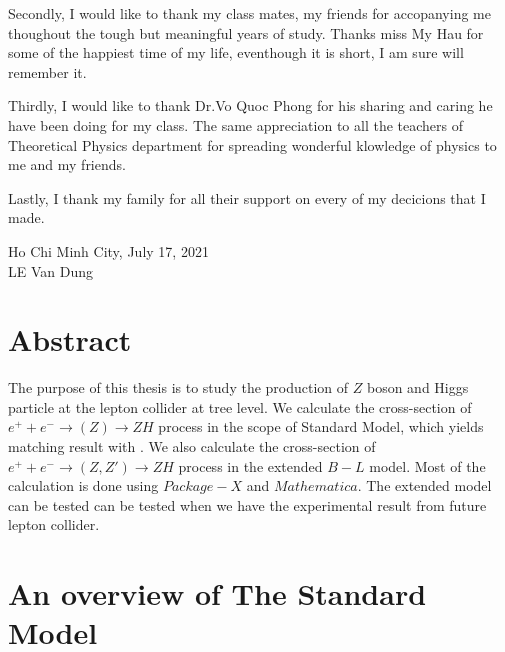 \documentclass{report}
\numberwithin{equation}{section}
\begin{document}
Secondly, I would like to thank my class mates, my friends for accopanying me thoughout the tough but meaningful years of study. Thanks miss My Hau for some of the happiest time of my life, eventhough it is short, I am sure will remember it. 

Thirdly, I would like to thank Dr.Vo Quoc Phong for his sharing and caring he have been doing for my class. The same appreciation to all the teachers of Theoretical Physics department for spreading wonderful klowledge of physics to me and my friends.

Lastly, I thank my family for all their support on every of my decicions   that I made.
\begin{flushright}
\parbox{5cm}{\begin{center}
Ho Chi Minh City, July 17, 2021\\[0.25cm]
LE Van Dung\\
\end{center}
}
\end{flushright}
\chapter*{Abstract}
The purpose of this thesis is to study the production of $Z$ boson and Higgs particle at the lepton collider at tree level. We calculate the cross-section of $e^+ + e^-\rightarrow (Z) \rightarrow Z H$ process  in the scope of Standard Model, which yields matching result with \cite{Denner:1992bc}. We also calculate the cross-section of $e^+ + e^-\rightarrow (Z,Z') \rightarrow Z H$ process in the extended $B-L$ model. Most of the calculation is done using $Package-X$ and $Mathematica$. The extended model can be tested can be tested when we have the experimental result from future lepton collider.
\tableofcontents
\chapter{An overview of The Standard Model}
\end{document}
